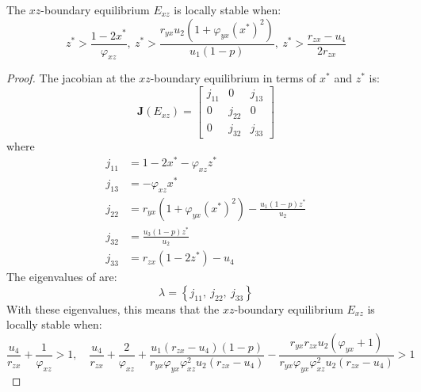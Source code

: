 \begin{theorem}\label{thm:eq-boundary-xz-stability}
    The $xz$-boundary equilibrium $E_{xz}$ is locally stable when:
    \begin{equation*}
        z^*>\frac{1-2x^*}{\varphi_{xz}},\ z^*>\frac{r_{yx}u_2\left(1+\varphi_{yx}\left(x^*\right)^2\right)}{u_1\left(1-p\right)},\ z^*>\frac{r_{zx}-u_4}{2r_{zx}}
    \end{equation*}
\end{theorem}
\begin{proof}
    The jacobian at the $xz$-boundary equilibrium in terms of $x^*$ and $z^*$ is:
    \begin{equation}\label{matrix:jacobian-boundary-xz}
        \textbf{J}\left(E_{xz}\right) = \begin{bmatrix}
            j_{11} & 0 & j_{13}\\
            0 & j_{22} & 0\\
            0 & j_{32} & j_{33}
        \end{bmatrix}
    \end{equation}
    where
    \begin{align*}
        j_{11} &= 1-2x^*-\varphi_{xz}z^*\\
        j_{13} &= -\varphi_{xz}x^*\\
        j_{22} &= r_{yx}\left(1+\varphi_{yx}\left(x^*\right)^2\right)-\frac{u_1\left(1-p\right)z^*}{u_2}\\
        j_{32} &= \frac{u_3\left(1-p\right)z^*}{u_2}\\
        j_{33} &= r_{zx}\left(1-2z^*\right)-u_4
    \end{align*}
    The eigenvalues of  are:
    \begin{equation*}
        \lambda=\left\{j_{11},\ j_{22},\ j_{33}\right\}
    \end{equation*}
    With these eigenvalues, this means that the $xz$-boundary equilibrium $E_{xz}$ is locally stable when:
    \begin{equation*}
        \frac{u_4}{r_{zx}}+\frac{1}{\varphi_{xz}} > 1,\quad
        \frac{u_4}{r_{zx}}+\frac{2}{\varphi_{xz}}+\frac{u_1\left(r_{zx}-u_4\right)\left(1-p\right)}{r_{yx}\varphi_{yx}\varphi_{xz}^2u_2\left(r_{zx}-u_4\right)}-\frac{r_{yx}r_{zx}u_2\left(\varphi_{yx}+1\right)}{r_{yx}\varphi_{yx}\varphi_{xz}^2u_2\left(r_{zx}-u_4\right)} > 1
    \end{equation*}
\end{proof}


